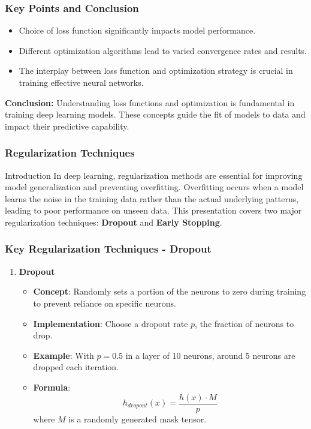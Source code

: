 \documentclass[aspectratio=169]{beamer}
\begin{document}
\begin{frame}[fragile]
    \frametitle{Key Points and Conclusion}
    \begin{itemize}
        \item Choice of loss function significantly impacts model performance.
        \item Different optimization algorithms lead to varied convergence rates and results.
        \item The interplay between loss function and optimization strategy is crucial in training effective neural networks.
    \end{itemize}

    \textbf{Conclusion:} Understanding loss functions and optimization is fundamental in training deep learning models. These concepts guide the fit of models to data and impact their predictive capability.
\end{frame}

\begin{frame}[fragile]
    \frametitle{Regularization Techniques}
    \begin{block}{Introduction}
        In deep learning, regularization methods are essential for improving model generalization and preventing overfitting. 
        Overfitting occurs when a model learns the noise in the training data rather than the actual underlying patterns, leading to poor performance on unseen data.
        This presentation covers two major regularization techniques: \textbf{Dropout} and \textbf{Early Stopping}.
    \end{block}
\end{frame}

\begin{frame}[fragile]
    \frametitle{Key Regularization Techniques - Dropout}
    \begin{enumerate}
        \item \textbf{Dropout}
        \begin{itemize}
            \item \textbf{Concept}: Randomly sets a portion of the neurons to zero during training to prevent reliance on specific neurons.
            \item \textbf{Implementation}: Choose a dropout rate \( p \), the fraction of neurons to drop.
            \item \textbf{Example}: With \( p = 0.5 \) in a layer of 10 neurons, around 5 neurons are dropped each iteration.
            \item \textbf{Formula}:
            \begin{equation}
                h_{dropout}(x) = \frac{h(x) \cdot M}{p}
            \end{equation}
            where \( M \) is a randomly generated mask tensor.
        \end{itemize}
    \end{enumerate}
\end{frame}
\end{document}

